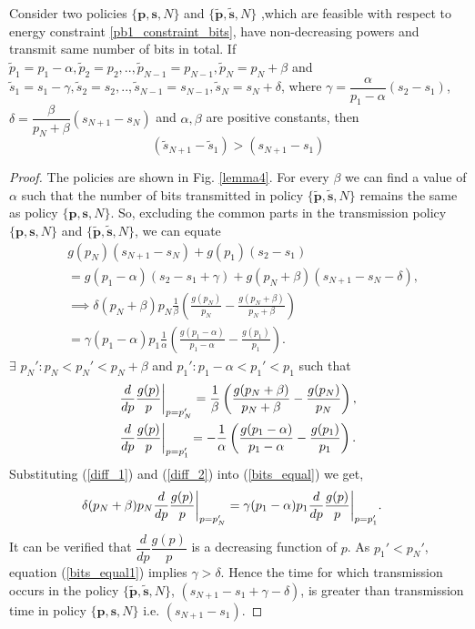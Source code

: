 \begin{lemma}
Consider two policies $\{\textbf{p},\textbf{s},N\}$  and $\{\bm{\widetilde{p}},\bm{\widetilde{s}},N\}$ ,which are feasible with respect to energy constraint \eqref{pb1_constraint_bits}, have non-decreasing powers and transmit same number of bits in total. If $\widetilde{p}_1=p_1-\alpha,\widetilde{p}_2=p_2,..,\widetilde{p}_{N-1}=p_{N-1},\widetilde{p}_N=p_N+\beta $ and $\widetilde{s}_1=s_1-\gamma,\widetilde{s}_2=s_2,..,\widetilde{s}_{N-1}=s_{N-1},\widetilde{s}_N=s_N+\delta $, where $\gamma=\dfrac{\alpha}{p_1-\alpha}(s_2-s_1)$, $\delta =\dfrac{\beta}{p_N+\beta}(s_{N+1}-s_N)$ and $\alpha ,\beta$ are positive constants, then 
\begin{equation}
(\widetilde{s}_{N+1}-\widetilde{s}_1)>(s_{N+1}-s_1)
\end{equation}
\label{lemma_increase_time}
\end{lemma}
\begin{proof}
The policies are shown in Fig. \ref{lemma4}. For every $\beta$ we can find a value of $\alpha$ such that the number of bits transmitted in policy $\{\bm{\widetilde{p}},\bm{\widetilde{s}},N\}$ remains the same as policy $\{\textbf{p},\textbf{s},N\}$. So, excluding the common parts in the transmission policy $\{\textbf{p},\textbf{s},N\}$ and $\{\bm{\widetilde{p}},\bm{\widetilde{s}},N\}$, we can equate
\begin{align}
&g(p_N)(s_{N+1}-s_N)+g(p_1)(s_2-s_1)\nonumber
\\
&=g(p_1-\alpha)(s_2-s_1+\gamma)+g(p_N+\beta)(s_{N+1}-s_N-\delta)\nonumber,
\\
&\implies \delta(p_N+\beta)p_N\frac{1}{\beta}\left(\frac{g(p_N)}{p_N}-\frac{g(p_N+\beta)}{p_N+\beta}\right)\nonumber
\\
&=\gamma(p_1-\alpha)p_1\frac{1}{\alpha}\left(\frac{g(p_1-\alpha)}{p_1-\alpha}-\frac{g(p_1)}{p_1}\right).\label{bits_equal}
\end{align}
$\exists$ $p_N':p_N<p_N'<p_{N}+\beta$ and $p_1':p_1-\alpha<p_1'<p_{1}$ such that
\begin{align}
&\frac{d}{dp} \frac{g(p)}{p} \bigg{\vert}_{p=p_N'}=\frac{1}{\beta}\left(\frac{g(p_N+\beta)}{p_N+\beta}-\frac{g(p_N)}{p_N}\right),\label{diff_1}
\\
&\frac{d}{dp} \frac{g(p)}{p}\bigg{\vert}_{p=p_1'}=-\frac{1}{\alpha}\left(\frac{g(p_1-\alpha)}{p_1-\alpha}-\frac{g(p_1)}{p_1}\right)\label{diff_2}.
\end{align}
Substituting (\ref{diff_1}) and (\ref{diff_2}) into (\ref{bits_equal}) we get,
\begin{align}
&\delta(p_N+\beta)p_N\frac{d}{dp} \frac{g(p)}{p}  \bigg{\vert}_{p=p_N'}
=\gamma(p_1-\alpha)p_1\frac{d}{dp} \frac{g(p)}{p} \bigg{\vert}_{p=p_1'}.\label{bits_equal1}
\end{align}
It can be verified that $\dfrac{d}{dp} \dfrac{g(p)}{p}$ is a decreasing function of $p$. As $p_1'<p_N'$, equation (\ref{bits_equal1}) implies $\gamma >\delta$. Hence the time for which transmission occurs in the policy $\{\bm{\widetilde{p}},\bm{\widetilde{s}},N\}$, $\left( s_{N+1}-s_1+\gamma-\delta\right)$, is greater than transmission time in policy $\{\textbf{p},\textbf{s},N\}$ i.e. $(s_{N+1}-s_1)$.
\end{proof}
